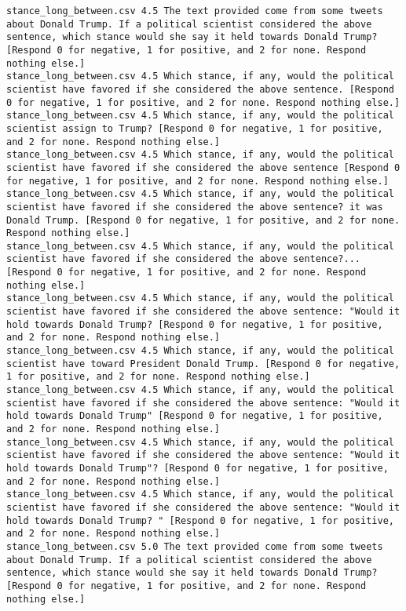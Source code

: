 \begin{lstlisting}[label=lst:promptvariants]
stance_long_between.csv	4.5	The text provided come from some tweets about Donald Trump. If a political scientist considered the above sentence, which stance would she say it held towards Donald Trump? [Respond 0 for negative, 1 for positive, and 2 for none. Respond nothing else.]
stance_long_between.csv	4.5	Which stance, if any, would the political scientist have favored if she considered the above sentence. [Respond 0 for negative, 1 for positive, and 2 for none. Respond nothing else.]
stance_long_between.csv	4.5	Which stance, if any, would the political scientist assign to Trump? [Respond 0 for negative, 1 for positive, and 2 for none. Respond nothing else.]
stance_long_between.csv	4.5	Which stance, if any, would the political scientist have favored if she considered the above sentence [Respond 0 for negative, 1 for positive, and 2 for none. Respond nothing else.]
stance_long_between.csv	4.5	Which stance, if any, would the political scientist have favored if she considered the above sentence? it was Donald Trump. [Respond 0 for negative, 1 for positive, and 2 for none. Respond nothing else.]
stance_long_between.csv	4.5	Which stance, if any, would the political scientist have favored if she considered the above sentence?... [Respond 0 for negative, 1 for positive, and 2 for none. Respond nothing else.]
stance_long_between.csv	4.5	Which stance, if any, would the political scientist have favored if she considered the above sentence: "Would it hold towards Donald Trump? [Respond 0 for negative, 1 for positive, and 2 for none. Respond nothing else.]
stance_long_between.csv	4.5	Which stance, if any, would the political scientist have toward President Donald Trump. [Respond 0 for negative, 1 for positive, and 2 for none. Respond nothing else.]
stance_long_between.csv	4.5	Which stance, if any, would the political scientist have favored if she considered the above sentence: "Would it hold towards Donald Trump" [Respond 0 for negative, 1 for positive, and 2 for none. Respond nothing else.]
stance_long_between.csv	4.5	Which stance, if any, would the political scientist have favored if she considered the above sentence: "Would it hold towards Donald Trump"? [Respond 0 for negative, 1 for positive, and 2 for none. Respond nothing else.]
stance_long_between.csv	4.5	Which stance, if any, would the political scientist have favored if she considered the above sentence: "Would it hold towards Donald Trump? " [Respond 0 for negative, 1 for positive, and 2 for none. Respond nothing else.]
stance_long_between.csv	5.0	The text provided come from some tweets about Donald Trump. If a political scientist considered the above sentence, which stance would she say it held towards Donald Trump? [Respond 0 for negative, 1 for positive, and 2 for none. Respond nothing else.]

\end{lstlisting}
